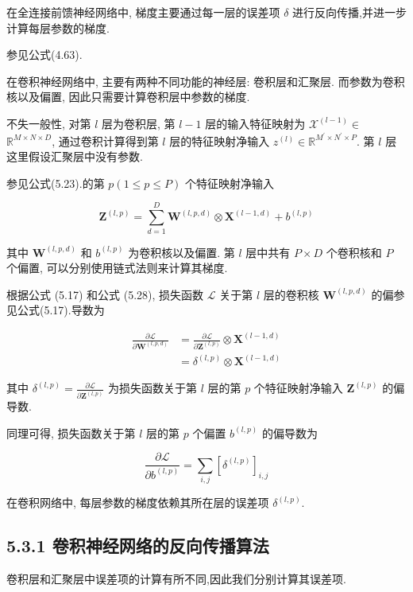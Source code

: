 \documentclass[10pt]{article}
\begin{document}
在全连接前馈神经网络中, 梯度主要通过每一层的误差项 $\delta$ 进行反向传播,并进一步计算每层参数的梯度.

参见公式(4.63).

在卷积神经网络中, 主要有两种不同功能的神经层: 卷积层和汇聚层. 而参数为卷积核以及偏置, 因此只需要计算卷积层中参数的梯度.

不失一般性, 对第 $l$ 层为卷积层, 第 $l-1$ 层的输入特征映射为 $\mathcal{X}^{(l-1)} \in$ $\mathbb{R}^{M \times N \times D}$, 通过卷积计算得到第 $l$ 层的特征映射净输入 $z^{(l)} \in \mathbb{R}^{M^{\prime} \times N^{\prime} \times P}$. 第 $l$ 层这里假设汇聚层中没有参数.

参见公式(5.23).的第 $p(1 \leq p \leq P)$ 个特征映射净输入


\begin{equation*}
\boldsymbol{Z}^{(l, p)}=\sum_{d=1}^{D} \boldsymbol{W}^{(l, p, d)} \otimes \boldsymbol{X}^{(l-1, d)}+b^{(l, p)} \tag{5.28}
\end{equation*}


其中 $\boldsymbol{W}^{(l, p, d)}$ 和 $b^{(l, p)}$ 为卷积核以及偏置. 第 $l$ 层中共有 $P \times D$ 个卷积核和 $P$ 个偏置, 可以分别使用链式法则来计算其梯度.

根据公式 (5.17) 和公式 (5.28), 损失函数 $\mathcal{L}$ 关于第 $l$ 层的卷积核 $\boldsymbol{W}^{(l, p, d)}$ 的偏参见公式(5.17).导数为


\begin{align*}
\frac{\partial \mathcal{L}}{\partial \boldsymbol{W}^{(l, p, d)}} & =\frac{\partial \mathcal{L}}{\partial \boldsymbol{Z}^{(l, p)}} \otimes \boldsymbol{X}^{(l-1, d)}  \tag{5.29}\\
& =\delta^{(l, p)} \otimes \boldsymbol{X}^{(l-1, d)} \tag{5.30}
\end{align*}


其中 $\delta^{(l, p)}=\frac{\partial \mathcal{L}}{\partial \boldsymbol{Z}^{(l, p)}}$ 为损失函数关于第 $l$ 层的第 $p$ 个特征映射净输入 $\boldsymbol{Z}^{(l, p)}$ 的偏导数.

同理可得, 损失函数关于第 $l$ 层的第 $p$ 个偏置 $b^{(l, p)}$ 的偏导数为


\begin{equation*}
\frac{\partial \mathcal{L}}{\partial b^{(l, p)}}=\sum_{i, j}\left[\delta^{(l, p)}\right]_{i, j} \tag{5.31}
\end{equation*}


在卷积网络中, 每层参数的梯度依赖其所在层的误差项 $\delta^{(l, p)}$.

\subsection*{5.3.1 卷积神经网络的反向传播算法}
卷积层和汇聚层中误差项的计算有所不同,因此我们分别计算其误差项.
\end{document}
